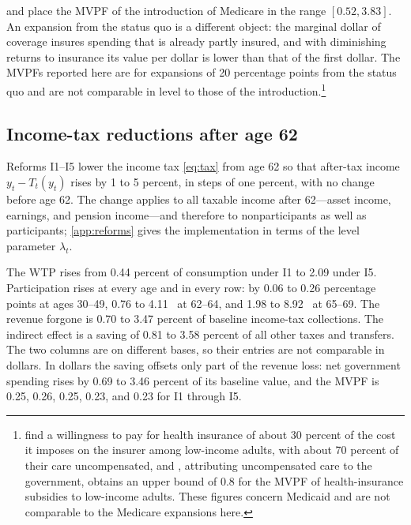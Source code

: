 \citet{finkelstein2008did} and \citet{hendren2020unified} place the MVPF of the introduction of Medicare in the range $[0.52,3.83]$. %
An expansion from the status quo is a different object: the marginal dollar of coverage insures spending that is already partly insured, and with diminishing returns to insurance its value per dollar is lower than that of the first dollar. The MVPFs reported here are for expansions of 20 percentage points from the status quo and are not comparable in level to those of the introduction.\footnote{\citet{finkelstein2019subsidizing} find a willingness to pay for health insurance of about 30 percent of the cost it imposes on the insurer among low-income adults, with about 70 percent of their care uncompensated, and \citet{hendren2020unified}, attributing uncompensated care to the government, obtains an upper bound of 0.8 for the MVPF of health-insurance subsidies to low-income adults. These figures concern Medicaid and are not comparable to the Medicare expansions here.} %

\subsection{Income-tax reductions after age 62}\label{subsec:incometax}

Reforms I1--I5 lower the income tax \eqref{eq:tax} from age 62 so that after-tax income $y_t-T_t(y_t)$ rises by 1 to 5 percent, in steps of one percent, with no change before age 62. %
The change applies to all taxable income after 62---asset income, earnings, and pension income---and therefore to nonparticipants as well as participants; \autoref{app:reforms} gives the implementation in terms of the level parameter $\lambda_t$. %

The WTP rises from 0.44 percent of consumption under I1 to 2.09 under I5. %
Participation rises at every age and in every row: by 0.06 to 0.26 percentage points at ages 30--49, 0.76 to 4.11 \pp\ at 62--64, and 1.98 to 8.92 \pp\ at 65--69. %
The revenue forgone is 0.70 to 3.47 percent of baseline income-tax collections. %
The indirect effect is a saving of 0.81 to 3.58 percent of all other taxes and transfers. %
The two columns are on different bases, so their entries are not comparable in dollars. In dollars the saving offsets only part of the revenue loss: net government spending rises by 0.69 to 3.46 percent of its baseline value, and the MVPF is 0.25, 0.26, 0.25, 0.23, and 0.23 for I1 through I5. %


